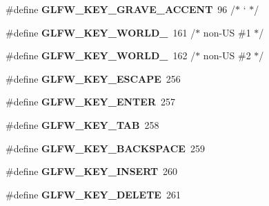 \begin{DoxyCompactItemize}
\item 
\hypertarget{group__keys_ga7a3701fb4e2a0b136ff4b568c3c8d668}{\#define {\bfseries \-G\-L\-F\-W\-\_\-\-K\-E\-Y\-\_\-\-G\-R\-A\-V\-E\-\_\-\-A\-C\-C\-E\-N\-T}~96  /$\ast$ ` $\ast$/}\label{group__keys_ga7a3701fb4e2a0b136ff4b568c3c8d668}

\item 
\hypertarget{group__keys_gadc78dad3dab76bcd4b5c20114052577a}{\#define {\bfseries \-G\-L\-F\-W\-\_\-\-K\-E\-Y\-\_\-\-W\-O\-R\-L\-D\-\_}~161 /$\ast$ non-\/\-U\-S \#1 $\ast$/}\label{group__keys_gadc78dad3dab76bcd4b5c20114052577a}

\item 
\hypertarget{group__keys_ga20494bfebf0bb4fc9503afca18ab2c5e}{\#define {\bfseries \-G\-L\-F\-W\-\_\-\-K\-E\-Y\-\_\-\-W\-O\-R\-L\-D\-\_}~162 /$\ast$ non-\/\-U\-S \#2 $\ast$/}\label{group__keys_ga20494bfebf0bb4fc9503afca18ab2c5e}

\item 
\hypertarget{group__keys_gaac6596c350b635c245113b81c2123b93}{\#define {\bfseries \-G\-L\-F\-W\-\_\-\-K\-E\-Y\-\_\-\-E\-S\-C\-A\-P\-E}~256}\label{group__keys_gaac6596c350b635c245113b81c2123b93}

\item 
\hypertarget{group__keys_ga9555a92ecbecdbc1f3435219c571d667}{\#define {\bfseries \-G\-L\-F\-W\-\_\-\-K\-E\-Y\-\_\-\-E\-N\-T\-E\-R}~257}\label{group__keys_ga9555a92ecbecdbc1f3435219c571d667}

\item 
\hypertarget{group__keys_ga6908a4bda9950a3e2b73f794bbe985df}{\#define {\bfseries \-G\-L\-F\-W\-\_\-\-K\-E\-Y\-\_\-\-T\-A\-B}~258}\label{group__keys_ga6908a4bda9950a3e2b73f794bbe985df}

\item 
\hypertarget{group__keys_ga6c0df1fe2f156bbd5a98c66d76ff3635}{\#define {\bfseries \-G\-L\-F\-W\-\_\-\-K\-E\-Y\-\_\-\-B\-A\-C\-K\-S\-P\-A\-C\-E}~259}\label{group__keys_ga6c0df1fe2f156bbd5a98c66d76ff3635}

\item 
\hypertarget{group__keys_ga373ac7365435d6b0eb1068f470e34f47}{\#define {\bfseries \-G\-L\-F\-W\-\_\-\-K\-E\-Y\-\_\-\-I\-N\-S\-E\-R\-T}~260}\label{group__keys_ga373ac7365435d6b0eb1068f470e34f47}

\item 
\hypertarget{group__keys_gadb111e4df74b8a715f2c05dad58d2682}{\#define {\bfseries \-G\-L\-F\-W\-\_\-\-K\-E\-Y\-\_\-\-D\-E\-L\-E\-T\-E}~261}\label{group__keys_gadb111e4df74b8a715f2c05dad58d2682}


\end{DoxyCompactItemize}
